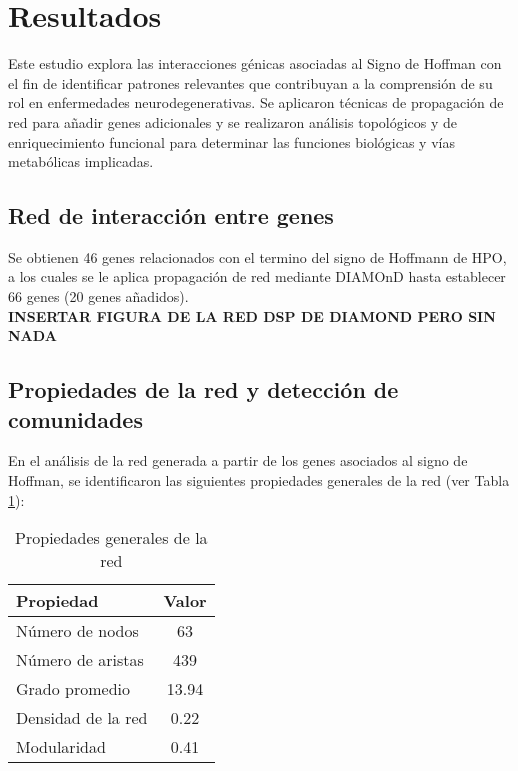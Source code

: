 \section{Resultados}

Este estudio explora las interacciones génicas asociadas al Signo de Hoffman con el fin de identificar patrones relevantes que contribuyan a la comprensión de su rol en enfermedades neurodegenerativas. Se aplicaron técnicas de propagación de red para añadir genes adicionales y se realizaron análisis topológicos y de enriquecimiento funcional para determinar las funciones biológicas y vías metabólicas implicadas.

\subsection{Red de interacción entre genes}


Se obtienen 46 genes relacionados con el termino del signo de Hoffmann de HPO, a los cuales se le aplica propagación de red mediante DIAMOnD hasta establecer 66 genes (20 genes añadidos).
\\

\textbf{INSERTAR FIGURA DE LA RED DSP DE DIAMOND PERO SIN NADA}\\

\subsection{Propiedades de la red y detección de comunidades}

En el análisis de la red generada a partir de los genes asociados al signo de Hoffman, se identificaron las siguientes propiedades generales de la red (ver Tabla \ref{tab:propiedades_red}):

\begin{table}[h!]
	\centering
	\caption{Propiedades generales de la red}
	\label{tab:propiedades_red}
	\begin{tabular}{|l|c|}
		\hline
		\textbf{Propiedad} & \textbf{Valor} \\ \hline
		\hline
		Número de nodos & 63 \\ \hline
		Número de aristas & 439 \\ \hline
		Grado promedio & 13.94 \\ \hline
		Densidad de la red & 0.22 \\ \hline
		Modularidad & 0.41 \\ \hline
	\end{tabular}
\end{table}


